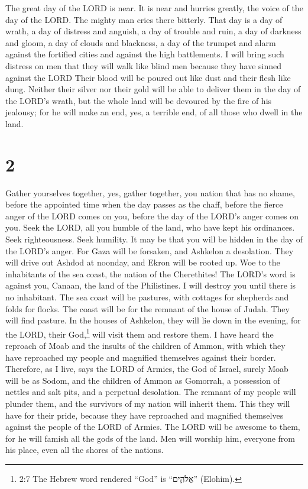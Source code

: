  The great day of the LORD is near. It is near and hurries
greatly, the voice of the day of the LORD. The mighty man cries there
bitterly.  That day is a day of wrath, a day of distress
and anguish, a day of trouble and ruin, a day of darkness and gloom, a
day of clouds and blackness,  a day of the trumpet and
alarm against the fortified cities and against the high battlements.
 I will bring such distress on men that they will walk like
blind men because they have sinned against the LORD Their blood will be
poured out like dust and their flesh like dung.  Neither
their silver nor their gold will be able to deliver them in the day of
the LORD's wrath, but the whole land will be devoured by the fire of his
jealousy; for he will make an end, yes, a terrible end, of all those who
dwell in the land.

\hypertarget{section-1}{%
\section{2}\label{section-1}}

 Gather yourselves together, yes, gather together, you
nation that has no shame,  before the appointed time when
the day passes as the chaff, before the fierce anger of the LORD comes
on you, before the day of the LORD's anger comes on you. 
Seek the LORD, all you humble of the land, who have kept his ordinances.
Seek righteousness. Seek humility. It may be that you will be hidden in
the day of the LORD's anger.  For Gaza will be forsaken, and
Ashkelon a desolation. They will drive out Ashdod at noonday, and Ekron
will be rooted up.  Woe to the inhabitants of the sea coast,
the nation of the Cherethites! The LORD's word is against you, Canaan,
the land of the Philistines. I will destroy you until there is no
inhabitant.  The sea coast will be pastures, with cottages
for shepherds and folds for flocks.  The coast will be for
the remnant of the house of Judah. They will find pasture. In the houses
of Ashkelon, they will lie down in the evening, for the LORD, their
God,\footnote{2:7 The Hebrew word rendered ``God'' is ``אֱלֹהִ֑ים''
  (Elohim).} will visit them and restore them.  I have heard
the reproach of Moab and the insults of the children of Ammon, with
which they have reproached my people and magnified themselves against
their border.  Therefore, as I live, says the LORD of
Armies, the God of Israel, surely Moab will be as Sodom, and the
children of Ammon as Gomorrah, a possession of nettles and salt pits,
and a perpetual desolation. The remnant of my people will plunder them,
and the survivors of my nation will inherit them.  This
they will have for their pride, because they have reproached and
magnified themselves against the people of the LORD of Armies.
 The LORD will be awesome to them, for he will famish all
the gods of the land. Men will worship him, everyone from his place,
even all the shores of the nations.

